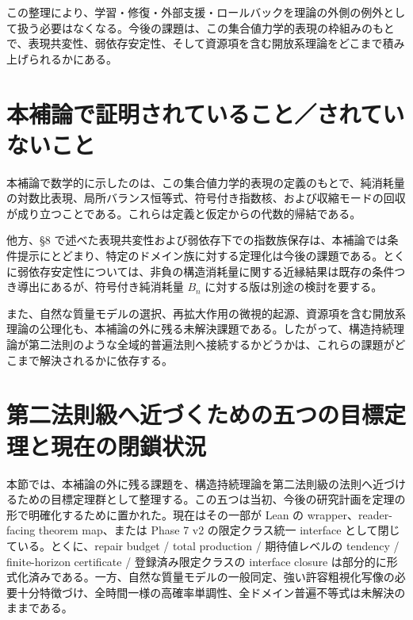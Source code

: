 \documentclass[12pt,a4paper]{article}
\begin{document}
この整理により、学習・修復・外部支援・ロールバックを理論の外側の例外として扱う必要はなくなる。今後の課題は、この集合値力学的表現の枠組みのもとで、表現共変性、弱依存安定性、そして資源項を含む開放系理論をどこまで積み上げられるかにある。

\section{本補論で証明されていること／されていないこと}\label{ux672cux88dcux8ad6ux3067ux8a3cux660eux3055ux308cux3066ux3044ux308bux3053ux3068ux3055ux308cux3066ux3044ux306aux3044ux3053ux3068}

本補論で数学的に示したのは、この集合値力学的表現の定義のもとで、純消耗量の対数比表現、局所バランス恒等式、符号付き指数核、および収縮モードの回収が成り立つことである。これらは定義と仮定からの代数的帰結である。

他方、§8 で述べた表現共変性および弱依存下での指数族保存は、本補論では条件提示にとどまり、特定のドメイン族に対する定理化は今後の課題である。とくに弱依存安定性については、非負の構造消耗量に関する近縁結果は既存の条件つき導出にあるが、符号付き純消耗量 \(B_{n}\) に対する版は別途の検討を要する。

また、自然な質量モデルの選択、再拡大作用の微視的起源、資源項を含む開放系理論の公理化も、本補論の外に残る未解決課題である。したがって、構造持続理論が第二法則のような全域的普遍法則へ接続するかどうかは、これらの課題がどこまで解決されるかに依存する。

\section{第二法則級へ近づくための五つの目標定理と現在の閉鎖状況}\label{ux7b2cux4e8cux6cd5ux5247ux7d1aux3078ux8fd1ux3065ux304fux305fux3081ux306eux4e94ux3064ux306eux76eeux6a19ux5b9aux7406ux3068ux73feux5728ux306eux9589ux9396ux72b6ux6cc1}

本節では、本補論の外に残る課題を、構造持続理論を第二法則級の法則へ近づけるための目標定理群として整理する。この五つは当初、今後の研究計画を定理の形で明確化するために置かれた。現在はその一部が Lean の wrapper、reader-facing theorem map、または Phase 7 v2 の限定クラス統一 interface として閉じている。とくに、repair budget / total production / 期待値レベルの tendency / finite-horizon certificate / 登録済み限定クラスの interface closure は部分的に形式化済みである。一方、自然な質量モデルの一般同定、強い許容粗視化写像の必要十分特徴づけ、全時間一様の高確率単調性、全ドメイン普遍不等式は未解決のままである。
\end{document}
